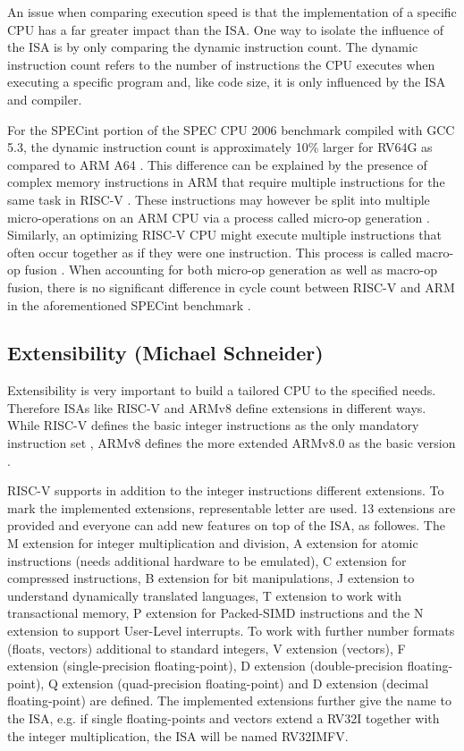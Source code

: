\documentclass[conference]{IEEEtran}
\begin{document}
	An issue when comparing execution speed is that the implementation of a specific \gls{CPU} has a far greater impact than the \gls{ISA}.
	One way to isolate the influence of the ISA is by only comparing the dynamic instruction count.
	The dynamic instruction count refers to the number of instructions the \gls{CPU} executes when executing a specific program
	and, like code size, it is only influenced by the \gls{ISA} and compiler.

	For the SPECint portion of the SPEC CPU 2006 benchmark compiled with GCC 5.3, the dynamic instruction count is approximately
	10\% larger for RV64G as compared to ARM A64 \cite[slide 38]{Celio2016}.
	This difference can be explained by the presence of complex memory instructions in ARM that require multiple instructions
	for the same task in RISC-V \cite[slide 40]{Celio2016}.
	These instructions may however be split into multiple micro-operations on an ARM \gls{CPU} via a process called micro-op generation \cite[slide 40]{Celio2016}.
	Similarly, an optimizing RISC-V CPU might execute multiple instructions that often occur together as if they were one instruction.
	This process is called macro-op fusion \cite[slide 16]{Celio2016}.
	When accounting for both micro-op generation as well as macro-op fusion, there is no significant difference in cycle count between RISC-V and ARM
	in the aforementioned SPECint benchmark \cite[slide 38]{Celio2016}.


	\subsection{Extensibility (Michael Schneider)}\label{sec:extensibility}
Extensibility is very important to build a tailored CPU to the specified needs. Therefore \glspl{ISA} like RISC-V and ARMv8 define extensions in different ways. While RISC-V defines the basic integer instructions as the only mandatory instruction set \cite{Waterman2017}, ARMv8 defines the more extended ARMv8.0 as the basic version \cite{Arm2020}.

RISC-V supports in addition to the integer instructions different extensions. To mark the implemented extensions, representable letter are used. 13 extensions are provided and everyone can add new features on top of the \gls{ISA}, as followes. The M extension for integer multiplication and division, A extension for atomic instructions (needs additional hardware to be emulated), C extension for compressed instructions, B extension for bit manipulations, J extension to understand dynamically translated languages, T extension to work with transactional memory, P extension for Packed-SIMD instructions and the N extension to support User-Level interrupts. To work with further number formats (floats, vectors) additional to standard integers, V extension (vectors), F extension (single-precision floating-point), D extension (double-precision floating-point), Q extension (quad-precision floating-point) and D extension (decimal floating-point) are defined. The implemented extensions further give the name to the \gls{ISA}, e.g. if single floating-points and vectors extend a RV32I together with the integer multiplication, the \gls{ISA} will be named RV32IMFV. \cite{Waterman2017}
\end{document}

